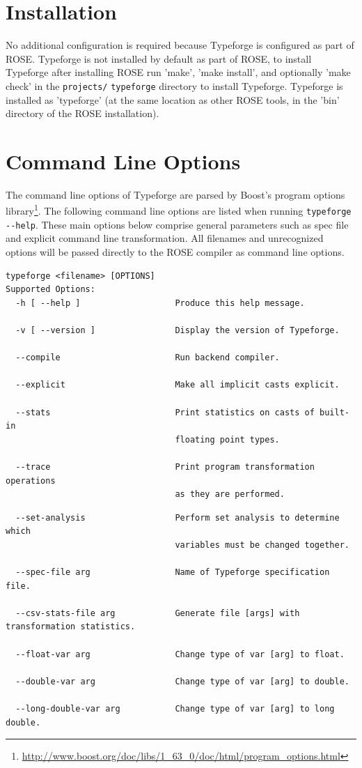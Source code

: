 \documentclass[natbib]{article}
\begin{document}
\section{Installation}

No additional configuration is required because Typeforge is configured as part of ROSE. Typeforge 
is not installed by default as part of ROSE, to install Typeforge after installing ROSE run 'make',
'make install', and optionally 'make check' in the \verb+projects/+ \verb+typeforge+ directory to 
install Typeforge. Typeforge is installed as 'typeforge' (at the same location as other ROSE tools, 
in the 'bin' directory of the ROSE installation).

\section{Command Line Options}
The command line options of Typeforge are parsed by Boost's program options 
library\footnote{\url{http://www.boost.org/doc/libs/1_63_0/doc/html/program_options.html}}.
The following command line options are listed when running \verb+typeforge --help+.
These main options below comprise general parameters such as spec file and explicit command line 
transformation. All filenames and unrecognized options will be passed directly to the ROSE compiler 
as command line options.

\begin{verbatim}
typeforge <filename> [OPTIONS]
Supported Options:
  -h [ --help ]                   Produce this help message.
  
  -v [ --version ]                Display the version of Typeforge.
  
  --compile                       Run backend compiler.
  
  --explicit                      Make all implicit casts explicit.
  
  --stats                         Print statistics on casts of built-in 
                                  floating point types.
                                  
  --trace                         Print program transformation operations 
                                  as they are performed.
\end{verbatim}
\begin{verbatim}
  --set-analysis                  Perform set analysis to determine which 
                                  variables must be changed together.
                                  
  --spec-file arg                 Name of Typeforge specification file.
  
  --csv-stats-file arg            Generate file [args] with transformation statistics.
  
  --float-var arg                 Change type of var [arg] to float.
  
  --double-var arg                Change type of var [arg] to double.
  
  --long-double-var arg           Change type of var [arg] to long double.
\end{verbatim}
\end{document}
